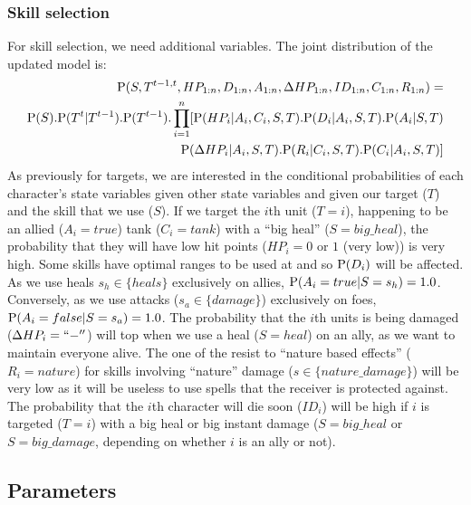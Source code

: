 \subsubsection{Skill selection}
For skill selection, we need additional variables. The joint distribution of the updated model is: 
\begin{eqnarray}
\mathrm{P}(S, T^{t-1,t}, HP_{1:n}, D_{1:n}, A_{1:n}, \Delta HP_{1:n}, ID_{1:n}, C_{1:n}, R_{1:n}) = \\
\mathrm{P}(S).\mathrm{P}(T^t|T^{t-1}).\mathrm{P}(T^{t-1}).\prod_{i=1}^n [ \mathrm{P}(HP_i | A_i, C_i, S, T).\mathrm{P}(D_i | A_i, S, T).\mathrm{P}(A_i | S, T) \\
        \mathrm{P}(\Delta HP_i | A_i, S, T). \mathrm{P}(R_i | C_i, S, T). \mathrm{P}(C_i | A_i, S, T) ]
\end{eqnarray}
As previously for targets, we are interested in the conditional probabilities of each character's state variables given other state variables and given our target ($T$) and the skill that we use ($S$). If we target the $i$th unit ($T=i$), happening to be an allied ($A_i=true$) tank ($C_i=tank$) with a ``big heal'' ($S=big\_heal$), the probability that they will have low hit points ($HP_i=0$ or $1$ (very low)) is very high. Some skills have optimal ranges to be used at and so $\mathrm{P}(D_i)$ will be affected. As we use heals $s_h\in \{heals\}$ exclusively on allies, $\mathrm{P}(A_i=true|S=s_h) =1.0$. Conversely, as we use attacks ($s_a\in \{damage\}$) exclusively on foes, $\mathrm{P}(A_i=false|S=s_a)=1.0$. The probability that the $i$th units is being damaged ($\Delta HP_i=``-''$) will top when we use a heal ($S=heal$) on an ally, as we want to maintain everyone alive. The one of the resist to ``nature based effects'' ($R_i=nature$) for skills involving ``nature'' damage ($s \in \{nature\_damage\}$) will be very low as it will be useless to use spells that the receiver is protected against. The probability that the $i$th character will die soon ($ID_i$) will be high if $i$ is targeted ($T=i$) with a big heal or big instant damage ($S=big\_heal$ or $S=big\_damage$, depending on whether $i$ is an ally or not). %


\subsection{Parameters}

